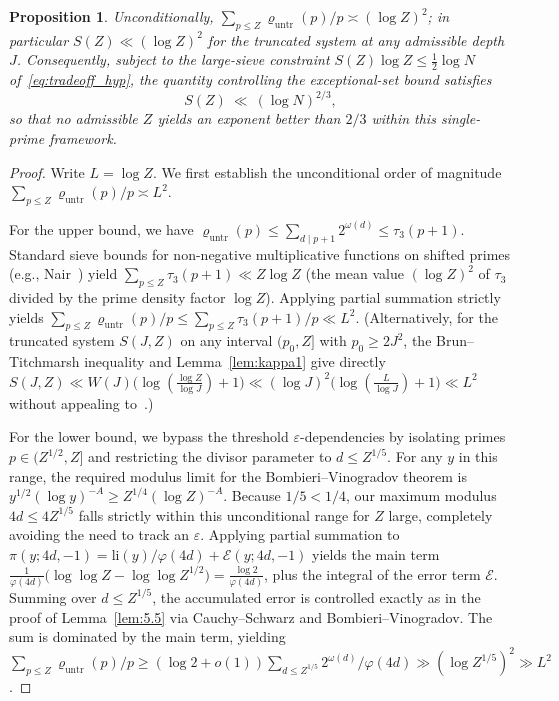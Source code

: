 \documentclass[11pt, a4paper]{article}
\theoremstyle{plain}
\newtheorem{proposition}[theorem]{Proposition}
\theoremstyle{definition}
\begin{document}
\begin{proposition}\label{prop:optimality_23}\label{thm:universal_tau3_ceiling}
Unconditionally, $\sum_{p\le Z}\varrho_{\mathrm{untr}}(p)/p\asymp(\log Z)^{2}$; in particular $S(Z)\ll(\log Z)^{2}$ for the truncated system at any admissible depth $J$. Consequently, subject to the large-sieve constraint $S(Z)\log Z\le\frac12\log N$ of~\eqref{eq:tradeoff_hyp}, the quantity controlling the exceptional-set bound satisfies
$$S(Z)\ \ll\ (\log N)^{2/3},$$
so that no admissible $Z$ yields an exponent better than $2/3$ within this single-prime framework.
\end{proposition}
\begin{proof}
Write $L=\log Z$. We first establish the unconditional order of magnitude $\sum_{p \le Z} \varrho_{\mathrm{untr}}(p)/p \asymp L^2$.

For the upper bound, we have $\varrho_{\mathrm{untr}}(p) \le \sum_{d \mid p+1} 2^{\omega(d)} \le \tau_3(p+1)$. Standard sieve bounds for non-negative multiplicative functions on shifted primes (e.g., Nair~\cite{nair1982}) yield $\sum_{p \le Z} \tau_3(p+1) \ll Z \log Z$ (the mean value $(\log Z)^{2}$ of $\tau_3$ divided by the prime density factor $\log Z$). Applying partial summation strictly yields $\sum_{p \le Z} \varrho_{\mathrm{untr}}(p)/p \le \sum_{p \le Z} \tau_3(p+1)/p \ll L^2$. (Alternatively, for the truncated system $S(J,Z)$ on any interval $(p_0,Z]$ with $p_0\ge 2J^{2}$, the Brun--Titchmarsh inequality and Lemma~\ref{lem:kappa1} give directly $S(J,Z)\ll W(J)\big(\log(\frac{\log Z}{\log J})+1\big)\ll (\log J)^{2}\big(\log(\frac{L}{\log J})+1\big)\ll L^{2}$ without appealing to~\cite{nair1982}.)

For the lower bound, we bypass the threshold $\varepsilon$-dependencies by isolating primes $p \in (Z^{1/2}, Z]$ and restricting the divisor parameter to $d \le Z^{1/5}$. For any $y$ in this range, the required modulus limit for the Bombieri--Vinogradov theorem is $y^{1/2}(\log y)^{-A} \ge Z^{1/4}(\log Z)^{-A}$. Because $1/5 < 1/4$, our maximum modulus $4d \le 4Z^{1/5}$ falls strictly within this unconditional range for $Z$ large, completely avoiding the need to track an $\varepsilon$. Applying partial summation to $\pi(y; 4d, -1) = \mathrm{li}(y)/\varphi(4d) + \mathcal{E}(y; 4d, -1)$ yields the main term $\frac{1}{\varphi(4d)}\big(\log\log Z - \log\log Z^{1/2}\big) = \frac{\log 2}{\varphi(4d)}$, plus the integral of the error term $\mathcal{E}$. Summing over $d \le Z^{1/5}$, the accumulated error is controlled exactly as in the proof of Lemma~\ref{lem:5.5} via Cauchy--Schwarz and Bombieri--Vinogradov. The sum is dominated by the main term, yielding $\sum_{p \le Z} \varrho_{\mathrm{untr}}(p)/p \ge (\log 2+o(1)) \sum_{d \le Z^{1/5}} 2^{\omega(d)}/\varphi(4d) \gg (\log Z^{1/5})^2 \gg L^2$.


\end{proof}
\end{document}
